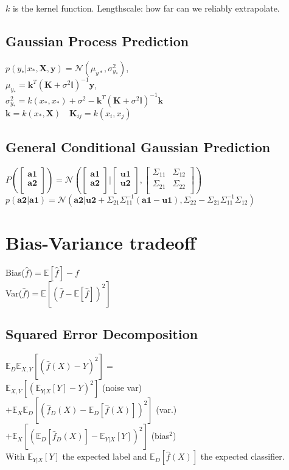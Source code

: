 $k$ is the kernel function. Lengthscale: how far can we reliably extrapolate.
\subsection*{Gaussian Process Prediction}
$p(y_*|x_*,\mathbf{X},\mathbf{y}) = \mathcal{N}(\mu_{y*},\sigma^2_{y_*})$,\\
$\mu_{y_*}=\mathbf{k}^T(\mathbf{K}+\sigma^2\mathbb{I})^{-1}\mathbf{y}$,\\
$\sigma^2_{y_*}=k(x_*,x_*){+}\sigma^2-\mathbf{k}^T(\mathbf{K}+\sigma^2\mathbb{I})^{-1}\mathbf{k}$\\
$\mathbf{k}=k(x_*,\mathbf{X})\quad \mathbf{K}_{ij}=k(x_i,x_j)$

\subsection*{General Conditional Gaussian Prediction}
$P(\begin{bmatrix}
\mathbf{a1}\\
\mathbf{a2}\\
\end{bmatrix}){=}\mathcal{N}(\begin{bmatrix}
\mathbf{a1}\\
\mathbf{a2}\\
\end{bmatrix}|\begin{bmatrix}
\mathbf{u1}\\
\mathbf{u2}\\
\end{bmatrix},\begin{bmatrix}
\Sigma_{11} & \Sigma_{12} \\
\Sigma_{21} & \Sigma_{22}\\
\end{bmatrix})$\\
 $p(\mathbf{a2}|\mathbf{a1}) =  \mathcal{N}(\mathbf{a2}|\mathbf{u2}+\Sigma_{21} \Sigma_{11}^{-1}(\mathbf{a1}-\mathbf{u1}), \Sigma_{22}- \Sigma_{21} \Sigma_{11}^{-1} \Sigma_{12})$


\section*{Bias-Variance tradeoff}
Bias($\hat{f}$)$=\mathbb{E}[\hat{f}]-f$\\
Var($\hat{f}$)$=\mathbb{E}[(\hat{f}-\mathbb{E}[\hat{f}])^2]$
\subsection*{Squared Error Decomposition}
$\mathbb{E}_D\mathbb{E}_{X,Y}[(\hat{f}(X)-Y)^2]=$\\
$\mathbb{E}_{X,Y}[(\mathbb{E}_{Y|X}[Y]-Y)^2]$ (noise var)\\
$+\mathbb{E}_X\mathbb{E}_D[(\hat{f}_D(X)-\mathbb{E}_D[\hat{f}(X)])^2]$ (var.)\\
$+\mathbb{E}_X[(\mathbb{E}_D[\hat{f}_D(X)]-\mathbb{E}_{Y|X}[Y])^2]$ (bias$^2$)\\
With $\mathbb{E}_{Y|X}[Y]$ the expected label and $\mathbb{E}_{D}[\hat{f}(X)]$ the expected classifier.